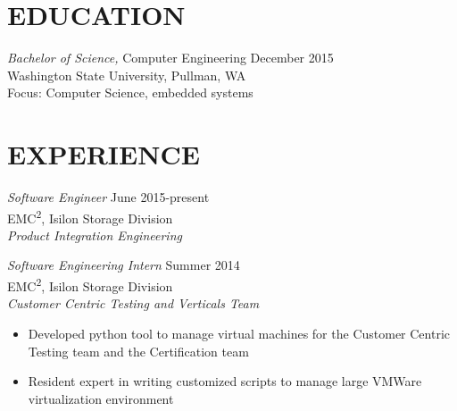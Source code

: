 \documentclass[line, margin]{res}
\begin{document}
\address{225 Cedar St Apt 710, Seattle, WA 98121}
\address{253-508-2725}

 
\begin{resume}

 
\section{EDUCATION} {\sl Bachelor of Science,} Computer Engineering \hfill December 2015 \\
                Washington State University, Pullman, WA\\
                Focus: Computer Science, embedded systems
 
\section{EXPERIENCE} 
                {\sl Software Engineer} \hfill June 2015-present \\
                EMC\textsuperscript{2}, Isilon Storage Division\\
                {\sl Product Integration Engineering}


                {\sl Software Engineering Intern} \hfill Summer 2014 \\
                EMC\textsuperscript{2}, Isilon Storage Division\\
                {\sl Customer Centric Testing and Verticals Team}
                 \begin{itemize}  \itemsep -2pt %
                 \item Developed python tool to manage virtual machines for the
                 Customer Centric Testing team and the Certification team
                \item Resident expert in writing customized scripts to manage large VMWare 
                virtualization environment
                \end{itemize}


\end{resume}
\end{document}
